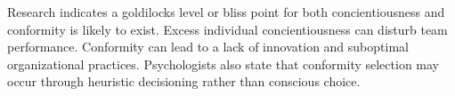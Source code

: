 \documentclass[review]{elsarticle}
\begin{document}





Research indicates a goldilocks level or bliss point for both concientiousness and conformity is likely to exist.
Excess individual concientiousness can disturb team performance\cite{curcseu2019personality}.
Conformity can lead to a lack of innovation and suboptimal organizational practices\cite{symon2006neglected}.
Psychologists also state that conformity selection may occur through heuristic decisioning rather than conscious choice.

\end{document}
